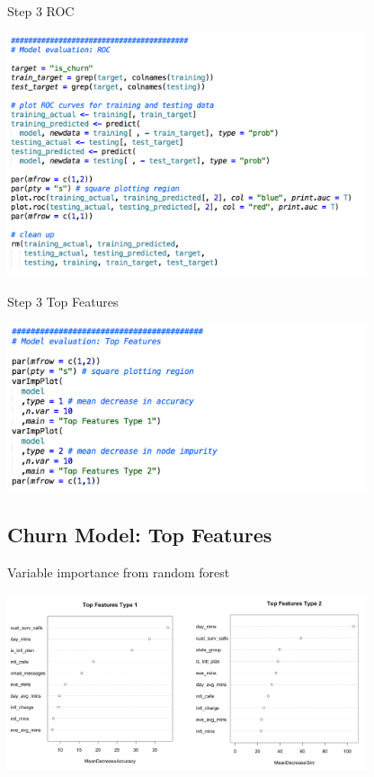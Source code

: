 \documentclass[10pt]{beamer}
\begin{document}
    \begin{frame}{Step 3 ROC}
        \begin{center}
          \includegraphics[width=300pt]{../graphs/demo_r_step_3_2}
        \end{center}
    \end{frame}

    \begin{frame}{Step 3 Top Features}
        \begin{center}
          \includegraphics[width=300pt]{../graphs/demo_r_step_3_3}
        \end{center}
    \end{frame}
    
  \subsection{Churn Model: Top Features}
  
    \begin{frame}{Variable importance from random forest}
        \begin{center}
          \includegraphics[width=300pt]{../graphs/rf_var_importance}
        \end{center}
    \end{frame}
\end{document}
